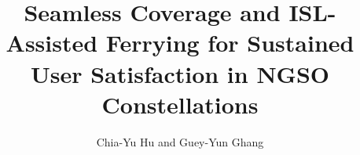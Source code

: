 \documentclass[12pt,UTF8,fontset=none,twocolumn]{ctexart}
\title{Seamless Coverage and ISL-Assisted Ferrying for Sustained User Satisfaction in NGSO Constellations}
\author{Chia-Yu Hu and Guey-Yun Ghang}
\date{}
\begin{document}
\maketitle
\thispagestyle{plain}
\pagestyle{plain}

\nocite{giordani2021ntn,lin2021leosat6g,zhujiang2022istn,alhraishawi2022ngsoSurvey,itur_rr2020,itur_s1503_2018,itur_s1528_2001,itur_s1428_2001,braun2019dyspan,hills2022beamsteering,jalali2023joint,li2021progressive,oneweb2016fcc}





\end{document}
